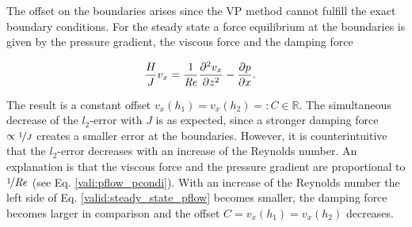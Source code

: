 The offset on the boundaries arises since the VP method cannot fulfill the exact boundary conditions.
For the steady state a force equilibrium at the boundaries is given by the pressure gradient, the viscous force and the damping force

\begin{align}
\label{valid:steady_state_pflow}
 \frac{H}{J} v_x &=  \frac{1}{\Rey}\frac{\partial^2 v_x}{\partial z^2} -\pdn[p]{x}.
\end{align}

The result is a constant offset $v_x(h_1) = v_x(h_2) =: C\in\mathbb{R}$.
The simultaneous decrease of the $l_2$-error with $J$ is as expected, since a stronger damping force $\propto \nicefrac{1}{J}$ creates a smaller
error at the boundaries.
However, it is counterintuitive that the $l_2$-error decreases with an increase of the Reynolds number.
An explanation is that the viscous force and the pressure gradient are proportional to $\nicefrac{1}{\mbox{\textit{Re}}}$
(see Eq. \ref{vali:pflow_pcondi}).
With an increase of the Reynolds number the left side of Eq. \ref{valid:steady_state_pflow} becomes smaller,
the damping force becomes larger in comparison and the  offset $C=v_x(h_1)=v_x(h_2)$ decreases.

